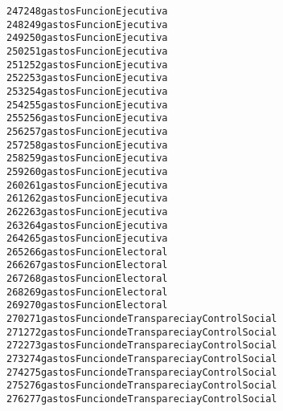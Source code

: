 \documentclass[letterpaper,10pt,english]{/usr/local/lib/python2.7/dist-packages/sphinx/texinputs/sphinxhowto}
\newenvironment{InvisibleVerbatim}
        {\begin{mdframed}[leftmargin=0.1\linewidth,innerleftmargin=3pt,innerrightmargin=3pt, userdefinedwidth=1\linewidth, linewidth=0pt, linecolor=white, usetwoside=false]}
        {\end{mdframed}}
\begin{document}
\begin{InvisibleVerbatim}
\begin{alltt}
247  248    gastos                         Funcion Ejecutiva
248  249    gastos                         Funcion Ejecutiva
249  250    gastos                         Funcion Ejecutiva
250  251    gastos                         Funcion Ejecutiva
251  252    gastos                         Funcion Ejecutiva
252  253    gastos                         Funcion Ejecutiva
253  254    gastos                         Funcion Ejecutiva
254  255    gastos                         Funcion Ejecutiva
255  256    gastos                         Funcion Ejecutiva
256  257    gastos                         Funcion Ejecutiva
257  258    gastos                         Funcion Ejecutiva
258  259    gastos                         Funcion Ejecutiva
259  260    gastos                         Funcion Ejecutiva
260  261    gastos                         Funcion Ejecutiva
261  262    gastos                         Funcion Ejecutiva
262  263    gastos                         Funcion Ejecutiva
263  264    gastos                         Funcion Ejecutiva
264  265    gastos                         Funcion Ejecutiva
265  266    gastos                         Funcion Electoral
266  267    gastos                         Funcion Electoral
267  268    gastos                         Funcion Electoral
268  269    gastos                         Funcion Electoral
269  270    gastos                         Funcion Electoral
270  271    gastos  Funcion de Transparecia y Control Social
271  272    gastos  Funcion de Transparecia y Control Social
272  273    gastos  Funcion de Transparecia y Control Social
273  274    gastos  Funcion de Transparecia y Control Social
274  275    gastos  Funcion de Transparecia y Control Social
275  276    gastos  Funcion de Transparecia y Control Social
276  277    gastos  Funcion de Transparecia y Control Social


\end{alltt}
\end{InvisibleVerbatim}
\end{document}
